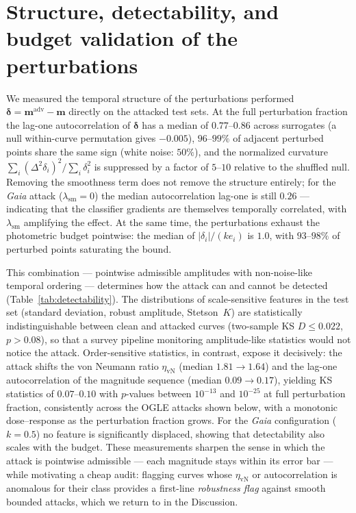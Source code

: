 \documentclass{aa}
\begin{document}
\section{Structure, detectability, and budget validation of the perturbations}
\label{app:detect}
\label{sec:pert_struct}
We measured the temporal structure of the perturbations performed $\boldsymbol{\delta} = \mathbf{m}^{\mathrm{adv}} - \mathbf{m}$ directly on the attacked test sets. At the full perturbation fraction the lag-one autocorrelation of $\boldsymbol{\delta}$ has a median of $0.77$--$0.86$ across surrogates (a null within-curve permutation gives $-0.005$), $96$--$99\%$ of adjacent perturbed points share the same sign (white noise: $50\%$), and the normalized curvature $\sum_i (\Delta^2\delta_i)^2 / \sum_i \delta_i^2$ is suppressed by a factor of $5$--$10$ relative to the shuffled null. Removing the smoothness term does not remove the structure entirely; for the \textit{Gaia} attack ($\lambda_{\mathrm{sm}}=0$) the median autocorrelation lag-one is still $0.26$ --- indicating that the classifier gradients are themselves temporally correlated, with $\lambda_{\mathrm{sm}}$ amplifying the effect. At the same time, the perturbations exhaust the photometric budget pointwise: the median of $|\delta_i| / (k e_i)$ is $1.0$, with $93$--$98\%$ of perturbed points saturating the bound.

This combination --- pointwise admissible amplitudes with non-noise-like temporal ordering --- determines how the attack can and cannot be detected (Table~\ref{tab:detectability}). The distributions of scale-sensitive features in the test set (standard deviation, robust amplitude, Stetson~$K$) are statistically indistinguishable between clean and attacked curves (two-sample KS $D \le 0.022$, $p > 0.08$), so that a survey pipeline monitoring amplitude-like statistics would not notice the attack. Order-sensitive statistics, in contrast, expose it decisively: the attack shifts the von Neumann ratio $\eta_{\mathrm{vN}}$ (median $1.81 \rightarrow 1.64$) and the lag-one autocorrelation of the magnitude sequence (median $0.09 \rightarrow 0.17$), yielding KS statistics of $0.07$--$0.10$ with $p$-values between $10^{-13}$ and $10^{-25}$ at full perturbation fraction, consistently across the OGLE attacks shown below, with a monotonic dose--response as the perturbation fraction grows. For the \textit{Gaia} configuration ($k=0.5$) no feature is significantly displaced, showing that detectability also scales with the budget. These measurements sharpen the sense in which the attack is pointwise admissible --- each magnitude stays within its error bar --- while motivating a cheap audit: flagging curves whose $\eta_{\mathrm{vN}}$ or autocorrelation is anomalous for their class provides a first-line \emph{robustness flag} against smooth bounded attacks, which we return to in the Discussion.
\end{document}
